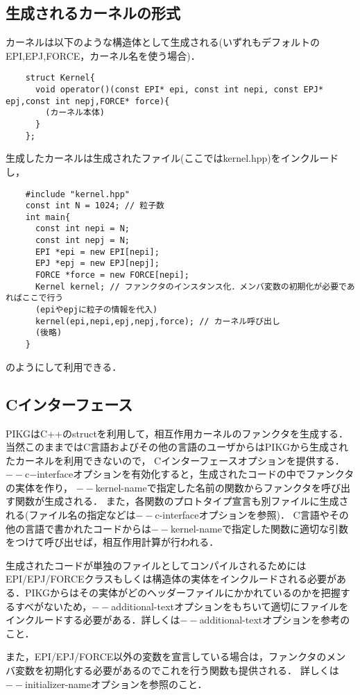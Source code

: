 \documentclass{article}
\begin{document}
  \subsection{生成されるカーネルの形式}
  カーネルは以下のような構造体として生成される(いずれもデフォルトのEPI,EPJ,FORCE，カーネル名を使う場合)．
\begin{verbatim}
	struct Kernel{
	  void operator()(const EPI* epi, const int nepi, const EPJ* epj,const int nepj,FORCE* force){
	    (カーネル本体)
	  }
	};
\end{verbatim}
生成したカーネルは生成されたファイル(ここではkernel.hpp)をインクルードし，
\begin{verbatim}
	#include "kernel.hpp"
	const int N = 1024; // 粒子数
	int main{
	  const int nepi = N;
	  const int nepj = N;
	  EPI *epi = new EPI[nepi];
	  EPJ *epj = new EPJ[nepj];
	  FORCE *force = new FORCE[nepi];
	  Kernel kernel; // ファンクタのインスタンス化．メンバ変数の初期化が必要であればここで行う
	  (epiやepjに粒子の情報を代入)
	  kernel(epi,nepi,epj,nepj,force); // カーネル呼び出し
	  (後略)
	}
\end{verbatim}
のようにして利用できる．


\subsection{Cインターフェース}
PIKGはC++のstructを利用して，相互作用カーネルのファンクタを生成する．
当然このままではC言語およびその他の言語のユーザからはPIKGから生成されたカーネルを利用できないので，
Cインターフェースオプションを提供する．
$--$c$-$interfaceオプションを有効化すると，生成されたコードの中でファンクタの実体を作り，
$--$kernel-nameで指定した名前の関数からファンクタを呼び出す関数が生成される．
また，各関数のプロトタイプ宣言も別ファイルに生成される(ファイル名の指定などは$--$c-interfaceオプションを参照)．
C言語やその他の言語で書かれたコードからは$--$kernel-nameで指定した関数に適切な引数をつけて呼び出せば，相互作用計算が行われる．

生成されたコードが単独のファイルとしてコンパイルされるためにはEPI/EPJ/FORCEクラスもしくは構造体の実体をインクルードされる必要がある．PIKGからはその実体がどのヘッダーファイルにかかれているのかを把握するすべがないため，$--$additional-textオプションをもちいて適切にファイルをインクルードする必要がある．詳しくは$--$additional-textオプションを参考のこと．

また，EPI/EPJ/FORCE以外の変数を宣言している場合は，ファンクタのメンバ変数を初期化する必要があるのでこれを行う関数も提供される．
詳しくは$--$initializer-nameオプションを参照のこと．
\end{document}
